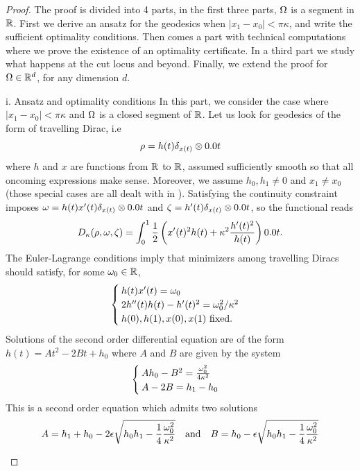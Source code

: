 \begin{proof}
The proof is divided into 4 parts, in the first three parts, $\Omega$ is a segment in $\mathbb{R}$. First we derive an ansatz for the geodesics when $\vert x_1-x_0\vert<\pi\kappa$, and write the sufficient optimality conditions. Then comes a part with technical computations where we prove the existence of an optimality certificate. In a third part we study what happens at the cut locus and beyond. Finally, we extend the proof for $\Omega \in \mathbb{R}^d$, for any dimension $d$. 
\item 
\begin{paragraph}{i. Ansatz and optimality conditions}
In this part, we consider the case where $\vert x_1 - x_0 \vert < \pi\kappa$ and $\Omega$ is a closed segment of $\mathbb{R}$. Let us look for geodesics of the form of travelling Dirac, i.e 
\begin{equation}
\label{travelling dirac}
\rho = h(t)\delta_{x(t)} \otimes \d t
\end{equation}
where $h$ and $x$ are functions from $\mathbb{R}$ to $\mathbb{R}$, assumed sufficiently smooth so that all oncoming expressions make sense. Moreover, we assume $h_0,h_1 \neq 0$ and $x_1\neq x_0$ (those special cases are all dealt with in ). Satisfying the continuity constraint imposes $\M = h(t)x'(t)\delta_{x(t)} \otimes \d t$ and $\Z = h'(t)\delta_{x(t)} \otimes \d t$, so the functional reads
\[
\ifonc(\rho,\M,\Z)=\int_0^1 \frac12 \left( x'(t)^2 h(t) +\kappa^2 \frac{h'(t)^2}{h(t)} \right) \d t.
\]
The Euler-Lagrange conditions imply that minimizers among travelling Diracs should satisfy, for some $\omega_0\in \mathbb{R}$,
\begin{eqnarray*}
\begin{cases}
h(t)x'(t)=\omega_0 \\
2h''(t)h(t)-h'(t)^2=\omega_0^2/\kappa^2 \\
h(0) , h(1) , x(0) , x(1) \text{ fixed.}
\end{cases}
\end{eqnarray*}
Solutions of the second order differential equation are of the form $h(t)=At^2-2Bt+h_0 $ where $A$ and $B$ are given by the system 
 \[
 \begin{cases}
A h_0-B^2 = \frac{\omega_0^2}{4\kappa^2} \\
A - 2B = h_1 - h_0
\end{cases}
 \]
 This is a second order equation which admits two solutions
\[
A =  h_1 +h_0 - 2 \epsilon \sqrt{h_0h_1-\frac{1}{4} \frac{\omega_0^2}{\kappa^2}} 
\quad \text{and} \quad 
B =  h_0 - \epsilon \sqrt{h_0h_1-\frac{1}{4} \frac{\omega_0^2}{\kappa^2}}
\]
\end{paragraph}
\end{proof}
